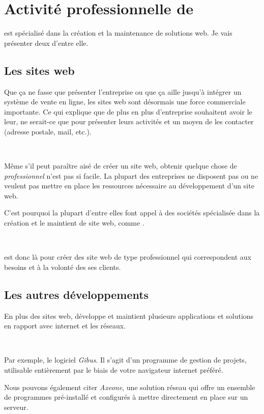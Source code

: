 \chapter{Activité professionnelle de \fidit}
\fidit{} est spécialisé dans la création et la maintenance de solutions web. Je vais présenter deux d'entre elle.

\section{Les sites web}
Que ça ne fasse que présenter l'entreprise ou que ça aille jusqu'à intégrer un système de vente en ligne, les sites web sont désormais une force commerciale importante. Ce qui explique que de plus en plus d'entreprise souhaitent avoir le leur, ne serait-ce que pour présenter leurs activités et un moyen de les contacter (adresse postale, mail, etc.).

~

Même s'il peut paraître aisé de créer un site web, obtenir quelque chose de \emph{professionnel} n'est pas si facile. La plupart des entreprises ne disposent pas ou ne veulent pas mettre en place les ressources nécessaire au développement d'un site web.

C'est pourquoi la plupart d'entre elles font appel à des sociétés spécialisée dans la création et le maintient de site web, comme \fidit.

~

\fidit{} est donc là pour créer des site web de type professionnel qui correspondent aux besoins et à la volonté des ses clients.

\section{Les autres développements}
En plus des sites web, \fidit{} développe et maintient plusieurs applications et solutions en rapport avec internet et les réseaux.

~

Par exemple, le logiciel \emph{Gibus}. Il s'agit d'un programme de gestion de projets, utilisable entièrement par le biais de votre navigateur internet préféré.

Nous pouvons également citer \emph{Axeone}, une solution réseau qui offre un ensemble de programmes pré-installé et configurés à mettre directement en place sur un serveur.
